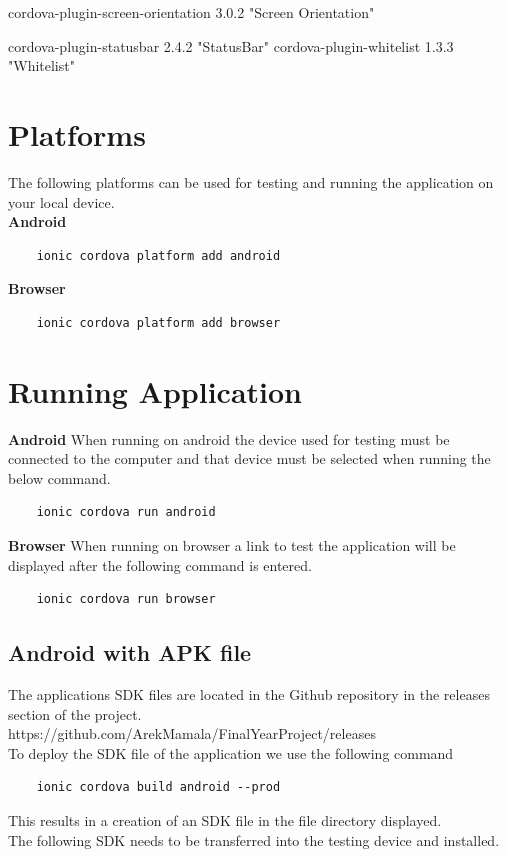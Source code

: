 \documentclass[a4paper,12pt]{report}
\begin{document}
cordova-plugin-screen-orientation 3.0.2 "Screen Orientation"

cordova-plugin-statusbar 2.4.2 "StatusBar"
cordova-plugin-whitelist 1.3.3 "Whitelist"

\section{Platforms}
The following platforms can be used for testing and running the application on your local device.\\
\textbf{Android}   
\begin{lstlisting}
    ionic cordova platform add android
\end{lstlisting}

\textbf{Browser}   
\begin{lstlisting}
    ionic cordova platform add browser
\end{lstlisting}

\section{Running Application}

\textbf{Android}   
When running on android the device used for testing must be connected to the computer and that device must be selected when running the below command.
\begin{lstlisting}
    ionic cordova run android
\end{lstlisting}

\textbf{Browser}   
When running on browser a link to test the application will be displayed after the following command is entered.
\begin{lstlisting}
    ionic cordova run browser
\end{lstlisting}


\subsection{Android with APK file}
The applications SDK files are located in the Github repository in the releases section of the project.
https://github.com/ArekMamala/FinalYearProject/releases\\

To deploy the SDK file of the application we use the following command
\begin{lstlisting}
    ionic cordova build android --prod 
\end{lstlisting}
This results in a creation of an SDK file in the file directory displayed.\\
The following SDK needs to be transferred into the testing device and installed.
\end{document}
